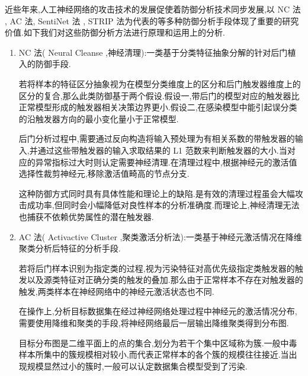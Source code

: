 近些年来,人工神经网络的攻击技术的发展促使着防御分析技术同步发展,以 NC 法 , AC 法, SentiNet 法 , STRIP 法为代表的等多种防御分析手段体现了重要的研究价值.如下我们对这些防御分析方法进行原理和运用上的分析.
\begin{enumerate}
	
	
	\item NC 法( Neural Cleanse ,神经清理):一类基于分类特征抽象分解的针对后门植入的防御手段.
	
	若将样本的特征区分抽象视为在模型分类维度上的区分和后门触发器维度上的区分的复合,那么此类防御基于两个假设.假设一,带后门的模型对应的触发器比正常模型形成的触发器相关决策边界更小.假设二,在感染模型中能引起误分类的沿触发器方向的最小变化量小于正常模型.
	
	后门分析过程中,需要通过反向构造将输入预处理为有相关系数的带触发器的输入,并通过这些带触发器的输入求取结果的 L1 范数来判断触发器的大小.当对应的异常指标过大时则认定需要神经清理.在清理过程中,根据神经元的激活值选择性裁剪神经元,移除激活值畸高的节点分支.
	
	这种防御方式同时具有具体性能和理论上的缺陷.是有效的清理过程虽会大幅攻击成功率,但同时会小幅降低对良性样本的分析准确度.而理论上,神经清理无法也捕获不依赖优势属性的潜在触发器.
	
	\item AC 法( Activactive Cluster ,聚类激活分析法):一类基于神经元激活情况在降维聚类分析后特征的分析手段.
	
	若将后门样本识别为指定类的过程,视为污染特征对高优先级指定类触发器的触发以及源类特征对正确分类的触发的叠加.那么由于正常样本不存在对触发器的触发,两类样本在神经网络中的神经元激活状态也不同.
	
	在操作上,分析目标数据集在经过神经网络处理过程中神经元的激活情况分布,需要使用降维和聚类的手段,将神经网络最后一层输出降维聚类得到分布图.
	
	目标分布图是二维平面上的点的集合,划分为若干个集中区域称为簇.一般中毒样本所集中的簇规模相对较小,而代表正常样本的各个簇的规模往往接近.当出现规模显然过小的簇时,一般可以认定数据集合模型受到了污染.
	

\end{enumerate}

